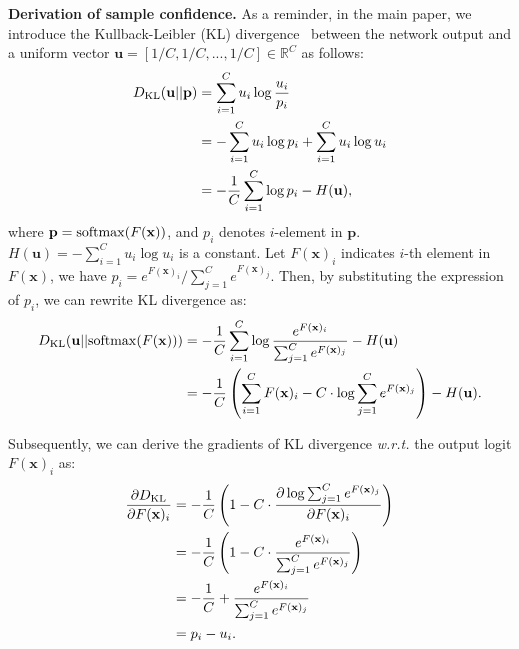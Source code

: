 \documentclass{article} \usepackage{iclr2024_conference,times}
\newcommand{\bfstart}[1]{\noindent\textbf{#1.}}
\begin{document}
\bfstart{Derivation of sample confidence}
As a reminder, in the main paper, we introduce the Kullback-Leibler (KL) divergence~\citep{tech:KL} between the network output and a uniform vector $\mathbf{u} = [1/C, 1/C, ..., 1/C] \in \mathbb{R}^C$ as follows:
\begin{equation*}
	\begin{aligned}
		D_{\rm KL}({\mathbf{u}}||\mathbf{p}) &= \sum_{i=1}^{C}u_i \log{\frac{u_i}{p_i}}	\\
		&= - \sum_{i=1}^{C}u_i \log{p_i} + \sum_{i=1}^{C}u_i \log{u_i} \\
		&= - \frac{1}{C} \sum_{i=1}^{C} \log{p_i} - H(\mathbf{u}),
	\end{aligned}
\end{equation*}
where $\mathbf{p} = {\rm softmax}(F(\mathbf{x}))$, and ${p}_i$ denotes $i$-element in $\mathbf{p}$.
$H(\mathbf{u})= -\sum_{i=1}^{C}u_i \log{u_i}$ is a constant. Let $F(\mathbf{x})_i$ indicates $i$-th element in $F(\mathbf{x})$, we have $p_i = {e^{F(\mathbf{x})_i}}/{\sum_{j=1}^{C} e^{F(\mathbf{x})_j}}$. Then, by substituting the expression of $p_i$, we can rewrite KL divergence as:
\begin{equation*}
	\begin{aligned}
		D_{\rm KL}({\mathbf{u}}||{\rm softmax}(F(\mathbf{x}))) &= - \frac{1}{C} \sum_{i=1}^{C} \log{ \frac{e^{F(\mathbf{x})_i}}{\sum_{j=1}^{C} e^{F(\mathbf{x})_j}} } - H(\mathbf{u})	\\
		&= - \frac{1}{C} \left( \sum_{i=1}^{C} {F(\mathbf{x})_i} - C \cdot \log{\sum_{j=1}^{C} e^{F(\mathbf{x})_j}} \right)- H(\mathbf{u}).
	\end{aligned}
\end{equation*}

Subsequently, we can derive the gradients of KL divergence \textit{w.r.t.} the output logit $F(\mathbf{x})_i$ as: 
\begin{equation*}
	\begin{aligned}
		\frac{\partial{D_{\rm KL}}}{\partial F(\mathbf{x})_i}  &= - \frac{1}{C} \left(1 - C \cdot \frac{\partial \log{\sum_{j=1}^{C} e^{F(\mathbf{x})_j}}}{\partial F(\mathbf{x})_i} \right) \\
		&= - \frac{1}{C} \left(1 - C \cdot \frac{e^{F(\mathbf{x})_i}}{\sum_{j=1}^{C} e^{F(\mathbf{x})_j}} \right)	\\
		&= - \frac{1}{C} + \frac{e^{F(\mathbf{x})_i}}{\sum_{j=1}^{C} e^{F(\mathbf{x})_j}}  \\
		&= p_i - u_i.
	\end{aligned}
\end{equation*}
\end{document}

